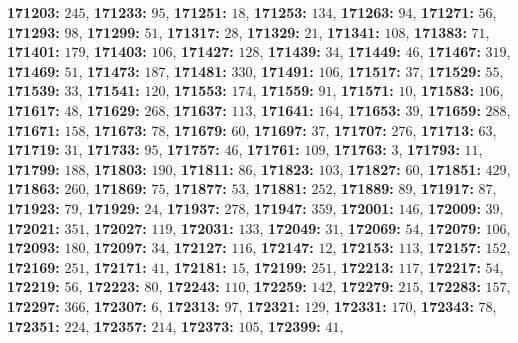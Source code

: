 \textsf{\bfseries 171203:} $245$, \textsf{\bfseries 171233:} $95$, \textsf{\bfseries 171251:} $18$, \textsf{\bfseries 171253:} $134$, \textsf{\bfseries 171263:} $94$, \textsf{\bfseries 171271:} $56$, \textsf{\bfseries 171293:} $98$, \textsf{\bfseries 171299:} $51$, \textsf{\bfseries 171317:} $28$, \textsf{\bfseries 171329:} $21$, \textsf{\bfseries 171341:} $108$, \textsf{\bfseries 171383:} $71$, \textsf{\bfseries 171401:} $179$, \textsf{\bfseries 171403:} $106$, \textsf{\bfseries 171427:} $128$, \textsf{\bfseries 171439:} $34$, \textsf{\bfseries 171449:} $46$, \textsf{\bfseries 171467:} $319$, \textsf{\bfseries 171469:} $51$, \textsf{\bfseries 171473:} $187$, \textsf{\bfseries 171481:} $330$, \textsf{\bfseries 171491:} $106$, \textsf{\bfseries 171517:} $37$, \textsf{\bfseries 171529:} $55$, \textsf{\bfseries 171539:} $33$, \textsf{\bfseries 171541:} $120$, \textsf{\bfseries 171553:} $174$, \textsf{\bfseries 171559:} $91$, \textsf{\bfseries 171571:} $10$, \textsf{\bfseries 171583:} $106$, \textsf{\bfseries 171617:} $48$, \textsf{\bfseries 171629:} $268$, \textsf{\bfseries 171637:} $113$, \textsf{\bfseries 171641:} $164$, \textsf{\bfseries 171653:} $39$, \textsf{\bfseries 171659:} $288$, \textsf{\bfseries 171671:} $158$, \textsf{\bfseries 171673:} $78$, \textsf{\bfseries 171679:} $60$, \textsf{\bfseries 171697:} $37$, \textsf{\bfseries 171707:} $276$, \textsf{\bfseries 171713:} $63$, \textsf{\bfseries 171719:} $31$, \textsf{\bfseries 171733:} $95$, \textsf{\bfseries 171757:} $46$, \textsf{\bfseries 171761:} $109$, \textsf{\bfseries 171763:} $3$, \textsf{\bfseries 171793:} $11$, \textsf{\bfseries 171799:} $188$, \textsf{\bfseries 171803:} $190$, \textsf{\bfseries 171811:} $86$, \textsf{\bfseries 171823:} $103$, \textsf{\bfseries 171827:} $60$, \textsf{\bfseries 171851:} $429$, \textsf{\bfseries 171863:} $260$, \textsf{\bfseries 171869:} $75$, \textsf{\bfseries 171877:} $53$, \textsf{\bfseries 171881:} $252$, \textsf{\bfseries 171889:} $89$, \textsf{\bfseries 171917:} $87$, \textsf{\bfseries 171923:} $79$, \textsf{\bfseries 171929:} $24$, \textsf{\bfseries 171937:} $278$, \textsf{\bfseries 171947:} $359$, \textsf{\bfseries 172001:} $146$, \textsf{\bfseries 172009:} $39$, \textsf{\bfseries 172021:} $351$, \textsf{\bfseries 172027:} $119$, \textsf{\bfseries 172031:} $133$, \textsf{\bfseries 172049:} $31$, \textsf{\bfseries 172069:} $54$, \textsf{\bfseries 172079:} $106$, \textsf{\bfseries 172093:} $180$, \textsf{\bfseries 172097:} $34$, \textsf{\bfseries 172127:} $116$, \textsf{\bfseries 172147:} $12$, \textsf{\bfseries 172153:} $113$, \textsf{\bfseries 172157:} $152$, \textsf{\bfseries 172169:} $251$, \textsf{\bfseries 172171:} $41$, \textsf{\bfseries 172181:} $15$, \textsf{\bfseries 172199:} $251$, \textsf{\bfseries 172213:} $117$, \textsf{\bfseries 172217:} $54$, \textsf{\bfseries 172219:} $56$, \textsf{\bfseries 172223:} $80$, \textsf{\bfseries 172243:} $110$, \textsf{\bfseries 172259:} $142$, \textsf{\bfseries 172279:} $215$, \textsf{\bfseries 172283:} $157$, \textsf{\bfseries 172297:} $366$, \textsf{\bfseries 172307:} $6$, \textsf{\bfseries 172313:} $97$, \textsf{\bfseries 172321:} $129$, \textsf{\bfseries 172331:} $170$, \textsf{\bfseries 172343:} $78$, \textsf{\bfseries 172351:} $224$, \textsf{\bfseries 172357:} $214$, \textsf{\bfseries 172373:} $105$, \textsf{\bfseries 172399:} $41$, 

